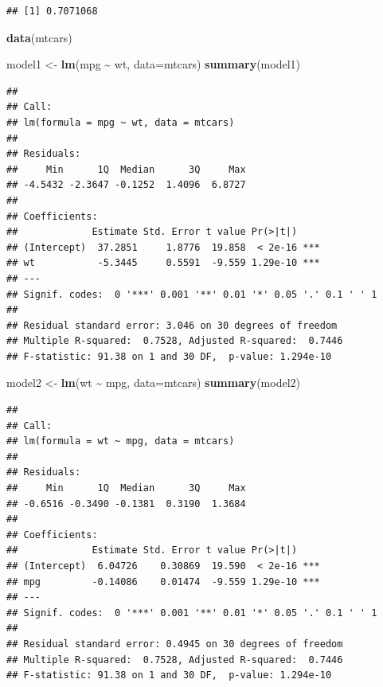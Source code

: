 \documentclass[
]{article}
\newenvironment{Shaded}{\begin{snugshade}}{\end{snugshade}}
\newcommand{\AttributeTok}[1]{\textcolor[rgb]{0.13,0.29,0.53}{#1}}
\newcommand{\FunctionTok}[1]{\textcolor[rgb]{0.13,0.29,0.53}{\textbf{#1}}}
\newcommand{\NormalTok}[1]{#1}
\newcommand{\OtherTok}[1]{\textcolor[rgb]{0.56,0.35,0.01}{#1}}
\newcommand{\SpecialCharTok}[1]{\textcolor[rgb]{0.81,0.36,0.00}{\textbf{#1}}}
\begin{document}
\begin{verbatim}
## [1] 0.7071068
\end{verbatim}

\begin{Shaded}
\begin{Highlighting}[]
\FunctionTok{data}\NormalTok{(mtcars)}

\NormalTok{model1 }\OtherTok{\textless{}{-}} \FunctionTok{lm}\NormalTok{(mpg }\SpecialCharTok{\textasciitilde{}}\NormalTok{ wt, }\AttributeTok{data=}\NormalTok{mtcars)}
\FunctionTok{summary}\NormalTok{(model1)}
\end{Highlighting}
\end{Shaded}

\begin{verbatim}
## 
## Call:
## lm(formula = mpg ~ wt, data = mtcars)
## 
## Residuals:
##     Min      1Q  Median      3Q     Max 
## -4.5432 -2.3647 -0.1252  1.4096  6.8727 
## 
## Coefficients:
##             Estimate Std. Error t value Pr(>|t|)    
## (Intercept)  37.2851     1.8776  19.858  < 2e-16 ***
## wt           -5.3445     0.5591  -9.559 1.29e-10 ***
## ---
## Signif. codes:  0 '***' 0.001 '**' 0.01 '*' 0.05 '.' 0.1 ' ' 1
## 
## Residual standard error: 3.046 on 30 degrees of freedom
## Multiple R-squared:  0.7528, Adjusted R-squared:  0.7446 
## F-statistic: 91.38 on 1 and 30 DF,  p-value: 1.294e-10
\end{verbatim}

\begin{Shaded}
\begin{Highlighting}[]
\NormalTok{model2 }\OtherTok{\textless{}{-}} \FunctionTok{lm}\NormalTok{(wt }\SpecialCharTok{\textasciitilde{}}\NormalTok{ mpg, }\AttributeTok{data=}\NormalTok{mtcars)}
\FunctionTok{summary}\NormalTok{(model2)}
\end{Highlighting}
\end{Shaded}

\begin{verbatim}
## 
## Call:
## lm(formula = wt ~ mpg, data = mtcars)
## 
## Residuals:
##     Min      1Q  Median      3Q     Max 
## -0.6516 -0.3490 -0.1381  0.3190  1.3684 
## 
## Coefficients:
##             Estimate Std. Error t value Pr(>|t|)    
## (Intercept)  6.04726    0.30869  19.590  < 2e-16 ***
## mpg         -0.14086    0.01474  -9.559 1.29e-10 ***
## ---
## Signif. codes:  0 '***' 0.001 '**' 0.01 '*' 0.05 '.' 0.1 ' ' 1
## 
## Residual standard error: 0.4945 on 30 degrees of freedom
## Multiple R-squared:  0.7528, Adjusted R-squared:  0.7446 
## F-statistic: 91.38 on 1 and 30 DF,  p-value: 1.294e-10
\end{verbatim}
\end{document}
